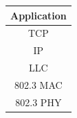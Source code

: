 \begin{minipage}{\linewidth}
    \begin{tabular}{|c|}
        \hline
        \cellcolor{lightpink}Application\\
        \hline
        \cellcolor{lightred}TCP\\
        \hline
        \cellcolor{lightorange}IP\\
        \hline
        \cellcolor{lightyellow} LLC\\
        \hline
        \cellcolor{lightgreen} 802.3 MAC\\
        \hline
        \cellcolor{lightgreen} 802.3 PHY\\
        \hline
\end{tabular}
\end{minipage}
\vspace*{0.4cm}
